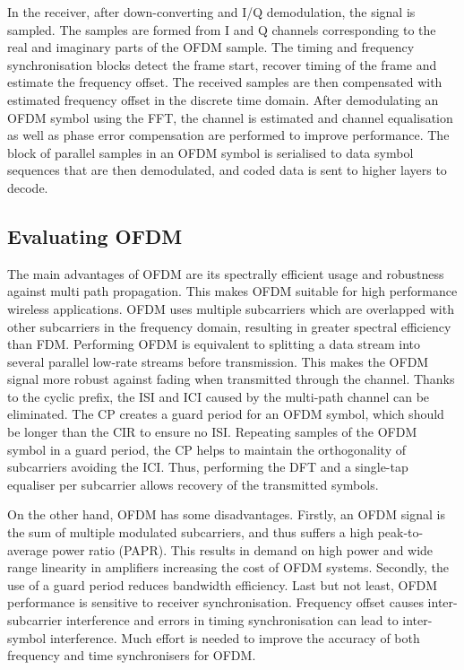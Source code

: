 In the receiver, after down-converting and I/Q demodulation, the signal is sampled. The samples are formed from I and Q channels corresponding to the real and imaginary parts of the OFDM sample.
The timing and frequency synchronisation blocks detect the frame start, recover timing of the frame and estimate the frequency offset.
The received samples are then compensated with estimated frequency offset in the discrete time domain.
After demodulating an OFDM symbol using the FFT, the channel is estimated and channel equalisation as well as phase error compensation are performed to improve performance.
The block of parallel samples in an OFDM symbol is serialised to data symbol sequences that are then demodulated, and coded data is sent to higher layers to decode.

\subsection{Evaluating OFDM}

The main advantages of OFDM are its spectrally efficient usage and robustness against multi path propagation.
This makes OFDM suitable for high performance wireless applications.
OFDM uses multiple subcarriers which are overlapped with other subcarriers in the frequency domain, resulting in greater spectral efficiency than FDM.
Performing OFDM is equivalent to splitting a data stream into several parallel low-rate streams before transmission.
This makes the OFDM signal more robust against fading when transmitted through the channel.
Thanks to the cyclic prefix, the ISI and ICI caused by the multi-path channel can be eliminated.
The CP creates a guard period for an OFDM symbol, which should be longer than the CIR to ensure no ISI.
Repeating samples of the OFDM symbol in a guard period, the CP helps to maintain the orthogonality of subcarriers avoiding the ICI.
Thus, performing the DFT and a single-tap equaliser per subcarrier allows recovery of the transmitted symbols.

On the other hand, OFDM has some disadvantages.
Firstly, an OFDM signal is the sum of multiple modulated subcarriers, and thus suffers a high peak-to-average power ratio (PAPR).
This results in demand on high power and wide range linearity in amplifiers increasing the cost of OFDM systems.
Secondly, the use of a guard period reduces bandwidth efficiency.
Last but not least, OFDM performance is sensitive to receiver synchronisation. Frequency offset causes inter-subcarrier interference and errors in timing synchronisation can lead to inter-symbol interference.
Much effort is needed to improve the accuracy of both frequency and time synchronisers for OFDM.



